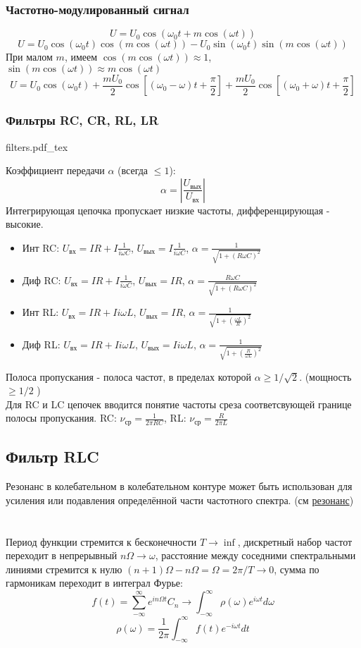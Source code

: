 \documentclass{article}
\newcommand{\incfig}[2][1]{%
    \def\svgwidth{#1\columnwidth}
    {#2.pdf_tex}
}
\begin{document}
\subsubsection{Частотно-модулированный сигнал}
\[U=U_0\cos(\omega_0 t + m\cos(\omega t))\]
\[U=U_0\cos(\omega_0 t)\cos(m\cos(\omega t))-U_0\sin(\omega_0 t)\sin(m\cos(\omega t))\]
При малом $m$, имеем $\cos(m\cos(\omega t)) \approx 1$, $\sin(m\cos(\omega t)) \approx m\cos(\omega t)$
\[U=U_0\cos(\omega_0 t) + \frac{mU_0}{2}\cos[(\omega_0-\omega)t+\frac{\pi}{2}] + \frac{mU_0}{2}\cos[(\omega_0+\omega)t+\frac{\pi}{2}] \]
\subsubsection{Фильтры RC, CR, RL, LR}
\incfig{filters}
Коэффициент передачи $\alpha$ (всегда $\le 1$):
\[\alpha=|\frac{U_{\text{вых}}}{U_{\text{вх}}}|\]
Интегрирующая цепочка пропускает низкие частоты, дифференцирующая - высокие.
\begin{itemize}
    \item Инт RC: $U_{\text{вх}}=IR+I\frac{1}{i\omega C}$, $U_{\text{вых}}=I\frac{1}{i\omega C}$, $\alpha=\frac{1}{\sqrt{1+(R\omega C)^2}}$
    \item Диф RC: $U_{\text{вх}}=IR+I\frac{1}{i\omega C}$, $U_{\text{вых}}=IR$, $\alpha=\frac{R\omega C}{\sqrt{1+(R\omega C)^2}}$
    \item Инт RL: $U_{\text{вх}}=IR+Ii\omega L$, $U_{\text{вых}}=IR$, $\alpha=\frac{1}{\sqrt{1+(\frac{\omega L}{R})^2}}$
    \item Диф RL: $U_{\text{вх}}=IR+Ii\omega L$, $U_{\text{вых}}=Ii\omega L$, $\alpha=\frac{1}{\sqrt{1+(\frac{R}{\omega L})^2}}$
\end{itemize}
Полоса пропускания - полоса частот, в пределах которой $\alpha \ge 1/\sqrt2$. (мощность $\ge 1/2$ )\\
Для RC и LC цепочек вводится понятие частоты среза соответсвующей границе полосы пропускания. RC: $\nu_{\text{ср}}=\frac{1}{2\pi RC}$, RL: $\nu_{\text{ср}}=\frac{R}{2\pi L}$
\subsection{Фильтр RLC}
Резонанс в колебательном в колебательном контуре может быть использован для усиления или подавления определённой части частотного спектра. (см \hyperref[sec:resonance]{резонанс})


\section{}
Период функции стремится к бесконечности $T\to \inf$, дискретный набор частот переходит в непрерывный $n\Omega\to\omega$, расстояние между соседними спектральными линиями стремится к нулю $(n+1)\Omega-n\Omega=\Omega=2\pi/T\to 0$, сумма по гармоникам переходит в интеграл Фурье:
\[f(t)=\sum_{-\infty}^{\infty}e^{in\Omega t}C_n\to\int_{-\infty}^{\infty}\rho(\omega)e^{i\omega t}d\omega\]
\[\rho(\omega) = \frac{1}{2\pi}\int_{-\infty}^{\infty}f(t)e^{-i\omega t}dt\]
\end{document}
